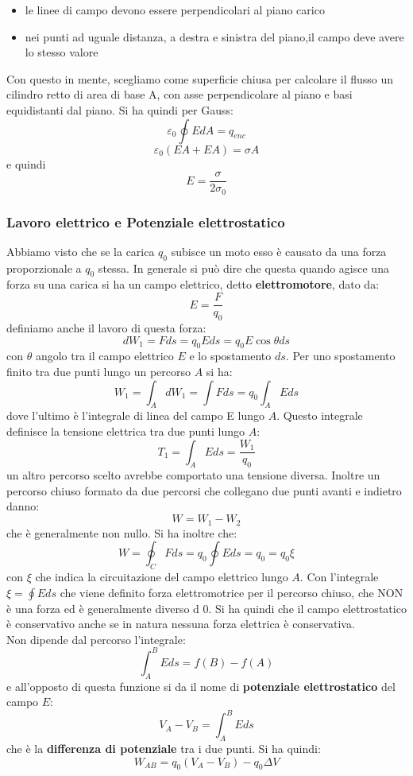 \documentclass[a4paper,12pt, oneside]{book}
\begin{document}
\begin{itemize}
\begin{itemize}
\item le linee di campo devono essere perpendicolari al piano carico 
\item nei punti ad uguale distanza, a destra e sinistra del piano,il campo deve avere lo stesso valore  
\end{itemize}
Con questo in mente, scegliamo come superficie chiusa per calcolare il flusso un cilindro retto di area di base A, con asse perpendicolare al piano e basi equidistanti dal piano. Si ha quindi per Gauss:
$$\varepsilon_0\oint EdA=q_{enc}$$
$$\varepsilon_0(EA+EA)=\sigma A$$
e quindi
$$E=\frac{\sigma}{2\sigma_0}$$
\end{itemize}
\newpage
\subsubsection{Lavoro elettrico e Potenziale elettrostatico}
Abbiamo visto che se la carica $q_0$ subisce un moto esso è causato da una forza proporzionale a $q_0$ stessa. In generale si può dire che questa quando agisce una forza su una carica si ha un campo elettrico, detto \textbf{elettromotore}, dato da:
$$E=\frac{F}{q_0}$$
definiamo anche il lavoro di questa forza:
$$dW_1=Fds=q_0Eds=q_0E\cos \theta ds$$
con $\theta$ angolo tra il campo elettrico $E$ e lo spostamento $ds$. Per uno spostamento finito tra due punti lungo un percorso $A$ si ha:
$$W_1=\int_A dW_1=\int Fds=q_0\int_A Eds$$
dove l'ultimo è l'integrale di linea del campo E lungo $A$. Questo integrale definisce la tensione elettrica tra due punti lungo $A$:
$$T_1=\int_AEds=\frac{W_1}{q_0}$$
un altro percorso scelto avrebbe comportato una tensione diversa. Inoltre un percorso chiuso formato da due percorsi che collegano due punti avanti e indietro danno:
$$W=W_1-W_2$$
che è generalmente non nullo. Si ha inoltre che:
$$W=\oint_C Fds=q_0\oint Eds=q_0=q_0\xi$$
con $\xi$ che indica la circuitazione del campo elettrico lungo $A$. Con l'integrale $\xi=\oint Eds$ che viene definito forza elettromotrice per il percorso chiuso, che NON è una forza ed è generalmente diverso d 0. Si ha quindi che il campo elettrostatico è conservativo anche se in natura nessuna forza elettrica è conservativa.\\
Non dipende dal percorso l'integrale:
$$\int_A^B Eds=f(B)-f(A)$$
e all'opposto di questa funzione si da il nome di \textbf{potenziale elettrostatico} del campo $E$:
$$V_A-V_B=\int_A^B Eds$$
che è la \textbf{differenza di potenziale} tra i due punti. Si ha quindi:
$$W_{AB}=q_0(V_A-V_B)-q_0\Delta V$$
\end{document}
